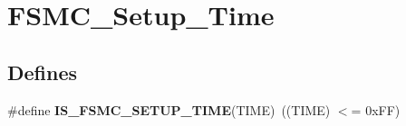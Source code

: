 \hypertarget{group__FSMC__Setup__Time}{
\section{FSMC\_\-Setup\_\-Time}
\label{group__FSMC__Setup__Time}
}
\subsection*{Defines}
\begin{DoxyCompactItemize}
\item 
\hypertarget{group__FSMC__Setup__Time_ga4f2fbb8f6ec492cc241a49c468e0d98d}{
\#define {\bfseries IS\_\-FSMC\_\-SETUP\_\-TIME}(TIME)~((TIME) $<$= 0xFF)}
\label{group__FSMC__Setup__Time_ga4f2fbb8f6ec492cc241a49c468e0d98d}

\end{DoxyCompactItemize}
